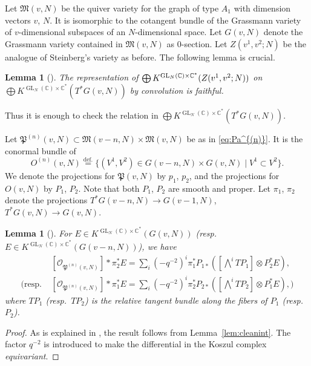 \documentclass[12pt]{amsart}
\def\Bbb{\mathbb}
\def\frak{\mathfrak}
\newcommand{\rom}{\textup}
\newtheorem{Lemma}[equation]{Lemma}
\theoremstyle{definition}
\theoremstyle{remark}
\numberwithin{equation}{subsection}
\newcommand{\lemref}[1]{Lemma~\ref{#1}}
\newcommand{\defeq}{\overset{\operatorname{\scriptstyle def.}}{=}}
\newcommand{\C}{{\Bbb C}}
\newcommand{\GL}{\operatorname{GL}}
\newcommand{\M}{{\frak M}} %
\newcommand{\Pa}{{\frak P}} %
\newcommand{\shfO}{\mathcal O}
\newcommand{\Wedge}{{\textstyle \bigwedge}}
\begin{document}
Let $\M(v,N)$ be the quiver variety for the graph of type $A_1$
with dimension vectors $v$, $N$. It is isomorphic to the cotangent
bundle of the Grassmann variety of $v$-dimensional subspaces of an
$N$-dimensional space. Let $G(v,N)$ denote the Grassmann variety
contained in $\M(v,N)$ as $0$-section. Let $Z(v^1,v^2;N)$ be the
analogue of Steinberg's variety as before. The following lemma is
crucial.
\begin{Lemma}[]\label{lem:Vass1}
The representation of
$\bigoplus K^{\GL_N(\C)\times\C^*}(\linebreak[4]Z(v^1,v^2;N))$ on
$\bigoplus K^{\GL_N(\C)\times\C^*}(T^*G(v,N))$ by convolution is faithful.
\end{Lemma}

Thus it is enough to check the relation in $\bigoplus
K^{\GL_N(\C)\times\C^*}(T^*G(v,N))$.

Let $\Pa^{(n)}(v,N)\subset\M(v-n,N)\times\M(v,N)$ be as in
\eqref{eq:Pa^{(n)}}. It is the conormal bundle of
\begin{equation*}
   O^{(n)}(v,N) \defeq
   \{ (V^1, V^2) \in G(v-n, N)\times G(v, N) \mid
   V^1 \subset V^2 \}.
\end{equation*}
We denote the projections for $\Pa(v,N)$ by $p_1$, $p_2$, and the
projections for $O(v,N)$ by $P_1$, $P_2$. Note that both $P_1$, $P_2$
are smooth and proper. Let $\pi_1$, $\pi_2$ denote the projections
$T^*G(v-n,N)\to G(v-1,N)$, $T^*G(v,N)\to G(v,N)$.

\begin{Lemma}[]\label{lem:Vass2}
For $E\in K^{\GL_N(\C)\times\C^*}(G(v,N))$
\rom(resp.\ $E\in K^{\GL_N(\C)\times\C^*}(G(v-n,N))$\rom), we have
\begin{equation*}
\begin{split}
   & [\shfO_{\Pa^{(n)}(v,N)}] * \pi_2^* E
   = \sum_i (-q^{-2})^i \pi_1^* P_{1*} \left( [\Wedge^i TP_1]
     \otimes P_2^* E\right), \\
   \Bigg(\text{resp.\ }
   & [\shfO_{\Pa^{(n)}(v,N)}] * \pi_1^* E
   = \sum_i (-q^{-2})^i \pi_2^* P_{2*} \left( [\Wedge^i TP_2]
     \otimes P_1^* E\right),\Bigg)
\end{split}
\end{equation*}
where $TP_1$ \rom(resp.\ $TP_2$\rom) is the relative tangent bundle
along the fibers of $P_1$ \rom(resp.\ $P_2$\rom). 
\end{Lemma}

\begin{proof}
As is explained in \cite[Corollary~4]{Vasserot}, the result follows
from \lemref{lem:cleanint}.
%
The factor $q^{-2}$ is introduced to make the differential in the
Koszul complex {\it equivariant}.
\end{proof}
\end{document}
